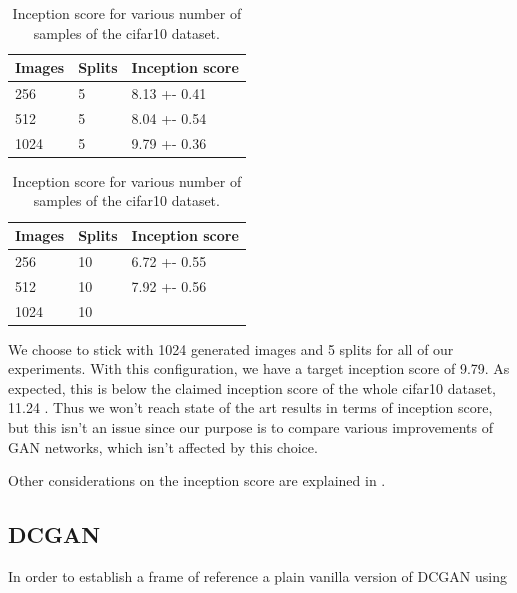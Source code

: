 \begin{table}[h]
\centering
\setlength{\tabcolsep}{0.5em} %

\begin{subtable}{.5\textwidth}
\centering

\begin{tabular}{l l l}
\toprule
Images & Splits & Inception score  \\ 
\midrule
      256  & 5 & 8.13 +- 0.41 \\   
      512  & 5 & 8.04 +- 0.54 \\ 
      1024 & 5 & 9.79 +- 0.36 \\
\bottomrule
\end{tabular}

\end{subtable}%
\begin{subtable}{.5\textwidth}
\centering

\begin{tabular}{l l l}
\toprule
Images & Splits & Inception score  \\ 
\midrule
      256  & 10 & 6.72 +- 0.55 \\   
      512  & 10 & 7.92 +- 0.56\\ 
      1024 & 10 & \\
\bottomrule
\end{tabular}
\end{subtable}%
%
\vspace{0.3cm}
\caption{Inception score for various number of samples of the cifar10 dataset.}
\label{table:exp-isc}
\end{table}%
We choose to stick with 1024 generated images and 5 splits for all of our experiments. With this configuration, we have a target inception score of 9.79. As expected, this is below the claimed inception score of the whole cifar10 dataset, 11.24 \cite{salimans2016improved}. Thus we won't reach state of the art results in terms of inception score, but this isn't an issue since our purpose is to compare various improvements of GAN networks, which isn't affected by this choice.

Other considerations on the inception score are explained in \cite{barratt2018note}.


\subsection{DCGAN}
In order to establish a frame of reference a plain vanilla version of DCGAN using 




